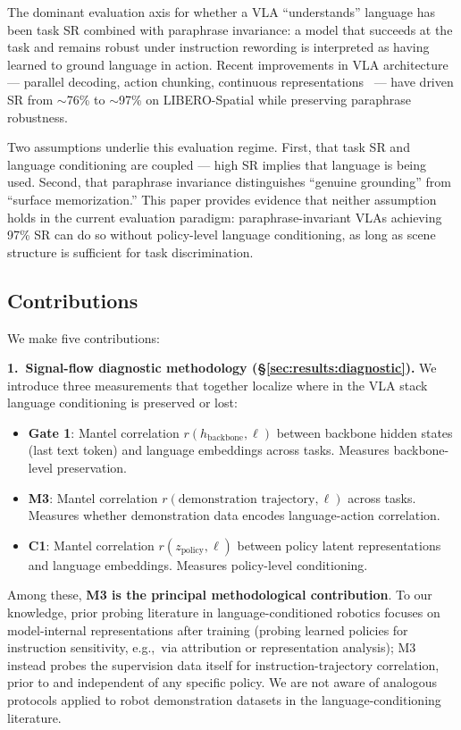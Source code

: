 The dominant evaluation axis for whether a VLA ``understands'' language has been task SR
combined with paraphrase invariance: a model that succeeds at the task and remains robust
under instruction rewording is interpreted as having learned to ground language in action.
Recent improvements in VLA architecture --- parallel decoding, action chunking, continuous
representations~\cite{kim2025openvla_oft} --- have driven SR from $\sim$76\% to $\sim$97\%
on LIBERO-Spatial while preserving paraphrase robustness.

Two assumptions underlie this evaluation regime. First, that task SR and language
conditioning are coupled --- high SR implies that language is being used. Second, that
paraphrase invariance distinguishes ``genuine grounding'' from ``surface memorization.''
This paper provides evidence that neither assumption holds in the current evaluation
paradigm: paraphrase-invariant VLAs achieving 97\% SR can do so without policy-level
language conditioning, as long as scene structure is sufficient for task discrimination.

\subsection{Contributions}
\label{sec:intro:contributions}

We make five contributions:

\textbf{1.~Signal-flow diagnostic methodology (\S\ref{sec:results:diagnostic}).} We
introduce three measurements that together localize where in the VLA stack language
conditioning is preserved or lost:
\begin{itemize}
  \item \textbf{Gate 1}: Mantel correlation $r(h_{\mathrm{backbone}}, \ell)$ between
        backbone hidden states (last text token) and language embeddings across tasks.
        Measures backbone-level preservation.
  \item \textbf{M3}: Mantel correlation $r(\text{demonstration trajectory}, \ell)$ across
        tasks. Measures whether demonstration data encodes language-action correlation.
  \item \textbf{C1}: Mantel correlation $r(z_{\mathrm{policy}}, \ell)$ between policy
        latent representations and language embeddings. Measures policy-level conditioning.
\end{itemize}
Among these, \textbf{M3 is the principal methodological contribution}. To our knowledge,
prior probing literature in language-conditioned robotics focuses on model-internal
representations after training (probing learned policies for instruction sensitivity,
e.g.,\ via attribution or representation analysis); M3 instead probes the supervision data
itself for instruction-trajectory correlation, prior to and independent of any specific
policy. We are not aware of analogous protocols applied to robot demonstration datasets in
the language-conditioning literature.

